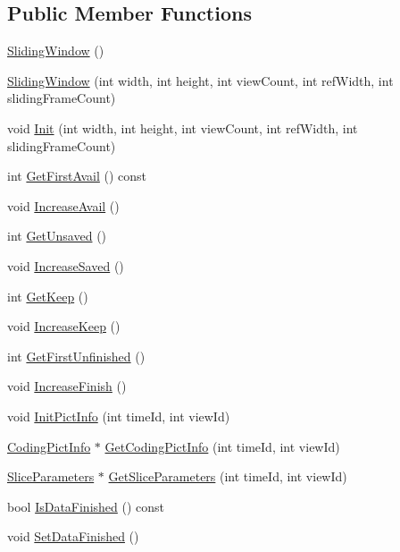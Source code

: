 \subsection*{Public Member Functions}
\begin{DoxyCompactItemize}
\item 
\hyperlink{class_sliding_window_a5fde76017cc202055cf3ae3011258106}{SlidingWindow} ()
\item 
\hyperlink{class_sliding_window_aa833d1b81d72234b0e37364295820e96}{SlidingWindow} (int width, int height, int viewCount, int refWidth, int slidingFrameCount)
\item 
void \hyperlink{class_sliding_window_ac71c1ed41e1b33a1ef3623c881e6d9d7}{Init} (int width, int height, int viewCount, int refWidth, int slidingFrameCount)
\item 
int \hyperlink{class_sliding_window_a2128091c76b407cd0e244759ba5a2846}{GetFirstAvail} () const 
\item 
void \hyperlink{class_sliding_window_a7bce9e53d3618b89f47684ec1432848d}{IncreaseAvail} ()
\item 
int \hyperlink{class_sliding_window_a3df64e20282ce10a45c4c3f3011e536d}{GetUnsaved} ()
\item 
void \hyperlink{class_sliding_window_aea027ce6f77dcee09d1aafb31d5732c5}{IncreaseSaved} ()
\item 
int \hyperlink{class_sliding_window_a0aafbf41ff2b7bb6c32fb60075bfeb22}{GetKeep} ()
\item 
void \hyperlink{class_sliding_window_a9b7a7426f6a495da2770e0743d4c97d7}{IncreaseKeep} ()
\item 
int \hyperlink{class_sliding_window_a3be69abc76bff5b71ab96dadcced9f65}{GetFirstUnfinished} ()
\item 
void \hyperlink{class_sliding_window_a8f303bc211297021f20e09dced119207}{IncreaseFinish} ()
\item 
void \hyperlink{class_sliding_window_a012dbfd5902b37d5ce3d37a115d9a96e}{InitPictInfo} (int timeId, int viewId)
\item 
\hyperlink{struct_coding_pict_info}{CodingPictInfo} $\ast$ \hyperlink{class_sliding_window_ac50874323a2aaa4ef76fab47f80c9f92}{GetCodingPictInfo} (int timeId, int viewId)
\item 
\hyperlink{struct_slice_parameters}{SliceParameters} $\ast$ \hyperlink{class_sliding_window_a020d2c25f1bda31337f91bf9b1a809d1}{GetSliceParameters} (int timeId, int viewId)
\item 
bool \hyperlink{class_sliding_window_afd67521d283b68f9fbc769ee9c0ba4b4}{IsDataFinished} () const 
\item 
void \hyperlink{class_sliding_window_ac2fd5605777fc2f4fdff84282a8467f8}{SetDataFinished} ()
\end{DoxyCompactItemize}


